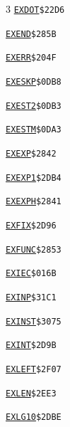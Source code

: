 \begin{multicols}{3}
\noindent\hyperlink{l:EXDOT}{\texttt{EXDOT}}\hfill\texttt{\$22D6~\phantom{000}\llap{\pageref{l:EXDOT}}}\par
\noindent\hyperlink{l:EXEND}{\texttt{EXEND}}\hfill\texttt{\$285B~\phantom{000}\llap{\pageref{l:EXEND}}}\par
\noindent\hyperlink{l:EXERR}{\texttt{EXERR}}\hfill\texttt{\$204F~\phantom{000}\llap{\pageref{l:EXERR}}}\par
\noindent\hyperlink{l:EXESKP}{\texttt{EXESKP}}\hfill\texttt{\$0DB8~\phantom{000}\llap{\pageref{l:EXESKP}}}\par
\noindent\hyperlink{l:EXEST2}{\texttt{EXEST2}}\hfill\texttt{\$0DB3~\phantom{000}\llap{\pageref{l:EXEST2}}}\par
\noindent\hyperlink{l:EXESTM}{\texttt{EXESTM}}\hfill\texttt{\$0DA3~\phantom{000}\llap{\pageref{l:EXESTM}}}\par
\noindent\hyperlink{l:EXEXP}{\texttt{EXEXP}}\hfill\texttt{\$2842~\phantom{000}\llap{\pageref{l:EXEXP}}}\par
\noindent\hyperlink{l:EXEXP1}{\texttt{EXEXP1}}\hfill\texttt{\$2DB4~\phantom{000}\llap{\pageref{l:EXEXP1}}}\par
\noindent\hyperlink{l:EXEXPH}{\texttt{EXEXPH}}\hfill\texttt{\$2841~\phantom{000}\llap{\pageref{l:EXEXPH}}}\par
\noindent\hyperlink{l:EXFIX}{\texttt{EXFIX}}\hfill\texttt{\$2D96~\phantom{000}\llap{\pageref{l:EXFIX}}}\par
\noindent\hyperlink{l:EXFUNC}{\texttt{EXFUNC}}\hfill\texttt{\$2853~\phantom{000}\llap{\pageref{l:EXFUNC}}}\par
\noindent\hyperlink{l:EXIEC}{\texttt{EXIEC}}\hfill\texttt{\$016B~\phantom{000}\llap{\pageref{l:EXIEC}}}\par
\noindent\hyperlink{l:EXINP}{\texttt{EXINP}}\hfill\texttt{\$31C1~\phantom{000}\llap{\pageref{l:EXINP}}}\par
\noindent\hyperlink{l:EXINST}{\texttt{EXINST}}\hfill\texttt{\$3075~\phantom{000}\llap{\pageref{l:EXINST}}}\par
\noindent\hyperlink{l:EXINT}{\texttt{EXINT}}\hfill\texttt{\$2D9B~\phantom{000}\llap{\pageref{l:EXINT}}}\par
\noindent\hyperlink{l:EXLEFT}{\texttt{EXLEFT}}\hfill\texttt{\$2F07~\phantom{000}\llap{\pageref{l:EXLEFT}}}\par
\noindent\hyperlink{l:EXLEN}{\texttt{EXLEN}}\hfill\texttt{\$2EE3~\phantom{000}\llap{\pageref{l:EXLEN}}}\par
\noindent\hyperlink{l:EXLG10}{\texttt{EXLG10}}\hfill\texttt{\$2DBE~\phantom{000}\llap{\pageref{l:EXLG10}}}\par

\end{multicols}
